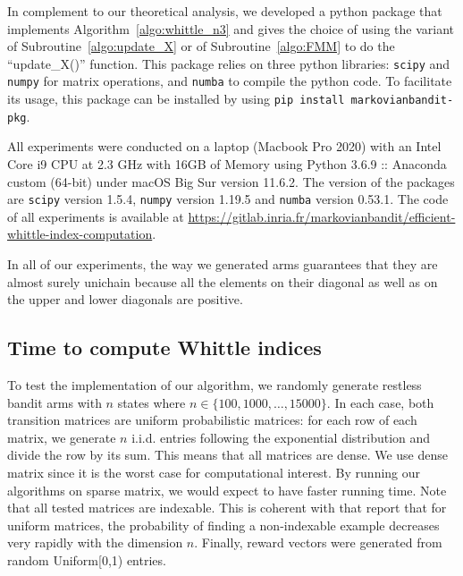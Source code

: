 In complement to our theoretical analysis, we developed a python package that implements Algorithm~\ref{algo:whittle_n3} and gives the choice of using the variant of Subroutine~\ref{algo:update_X} or of Subroutine~\ref{algo:FMM} to do the ``update\_X()'' function. This package relies on three python libraries: \texttt{scipy} and \texttt{numpy} for matrix operations, and \texttt{numba} to compile the python code. To facilitate its usage, this package can be installed by using \texttt{pip install markovianbandit-pkg}.

All experiments were conducted on a laptop (Macbook Pro 2020) with an Intel Core i9 CPU at 2.3 GHz with 16GB of Memory using Python 3.6.9 :: Anaconda custom (64-bit) under macOS Big Sur version 11.6.2. The version of the packages are \texttt{scipy} version 1.5.4, \texttt{numpy} version 1.19.5 and \texttt{numba} version 0.53.1. The code of all experiments is available at \url{https://gitlab.inria.fr/markovianbandit/efficient-whittle-index-computation}.

In all of our experiments, the way we generated arms guarantees that they are almost surely unichain because all the elements on their diagonal as well as on the upper and lower diagonals are positive.

\subsection{Time to compute Whittle indices}

To test the implementation of our algorithm, we randomly generate restless bandit arms with $n$ states where $n\in\{100,1000,\dots,15000\}$. In each case, both transition matrices are uniform probabilistic matrices: for each row of each matrix, we generate $n$ i.i.d. entries following the exponential distribution and divide the row by its sum. This means that all matrices are dense.
We use dense matrix since it is the worst case for computational interest. By running our algorithms on sparse matrix, we would expect to have faster running time.
Note that all tested matrices are indexable. This is coherent with \cite{gast2020exponential,nino2007dynamic} that report that for uniform matrices, the probability of finding a non-indexable example decreases very rapidly with the dimension $n$. Finally, reward vectors were generated from random Uniform[0,1) entries.

